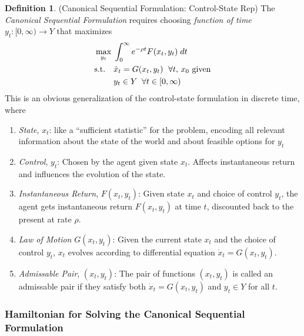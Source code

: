 \documentclass[12pt]{article}
\numberwithin{equation}{section} %
\theoremstyle{plain}
\theoremstyle{definition}
\newtheorem{defn}[thm]{Definition}
\theoremstyle{remark}
\newcommand{\ra}{\rightarrow}
\begin{document}
\begin{defn}{(Canonical Sequential Formulation: Control-State Rep)}
\label{defn:sequential-altrep-cts}
The \emph{Canonical Sequential Formulation} requires choosing
\emph{function of time} $y_t:[0,\infty) \ra Y$ that maximizes
\begin{align}
  \label{prob:cts-dynamic}
  \max_{y_t}\;
  &\int_0^\infty e^{-\rho t} F(x_t,y_t) \; dt
  \notag\\
  \text{s.t.}\quad
  &\text{$\dot{x}_{t} = G(x_t,y_t)$ $\;\forall t$, $x_0$ given}
  \notag\\
  &
  y_t \in Y \;\; \forall t\in[0,\infty)
\end{align}
This is an obvious generalization of the control-state formulation in
discrete time, where
\begin{enumerate}
  \item \emph{State}, $x_t$:
    like a ``sufficient statistic'' for the problem, encoding all
    relevant information about the state of the world and about feasible
    options for $y_t$

  \item \emph{Control}, $y_{t}$: Chosen by the agent given state $x_t$.
    Affects instantaneous return and influences the evolution of the
    state.

  \item \emph{Instantaneous Return}, $F(x_t,y_t)$: Given state $x_t$ and
    choice of control $y_t$, the agent gets instantaneous return
    $F(x_t,y_t)$ at time $t$, discounted back to the present at rate
    $\rho$.

  \item \emph{Law of Motion} $G(x_t,y_t)$: Given the current state $x_t$
    and the choice of control $y_t$,
    $x_t$ evolves according to differential equation
    $\dot{x}_t=G(x_t,y_t)$.
  \item \emph{Admissable Pair}, $(x_t,y_t)$: The pair of functions
    $(x_t,y_t)$ is called an admissable pair if they satisfy both
    $\dot{x}_t = G(x_t,y_t)$ and $y_t\in Y$ for all $t$.
\end{enumerate}
\end{defn}



\clearpage
\subsubsection{Hamiltonian for Solving the Canonical Sequential
Formulation}
\end{document}
